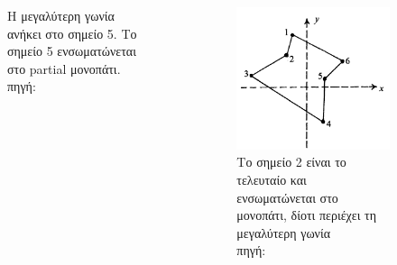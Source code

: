 \documentclass[xcolor=dvipsnames, 11pt]{beamer}
\begin{document}
\begin{frame}
\begin{columns}
\begin{column}{0.3\textwidth}
\begin{figure}
				\caption{Η μεγαλύτερη γωνία ανήκει στο σημείο 5. Το σημείο 5 ενσωματώνεται στο partial μονοπάτι. \\ πηγή: \cite{16}}
			\end{figure} 
		\end{column}
		\begin{column}{0.3\textwidth}
			\begin{figure}
				\includegraphics[scale=0.2]{images/geometric_approach_angle4.png}
				\caption{Το σημείο 2 είναι το τελευταίο και ενσωματώνεται στο μονοπάτι, δίοτι περιέχει τη μεγαλύτερη γωνία\\ πηγή: \cite{16}}
			\end{figure} 
		\end{column}	
	\end{columns}
\end{frame}
\end{document}
